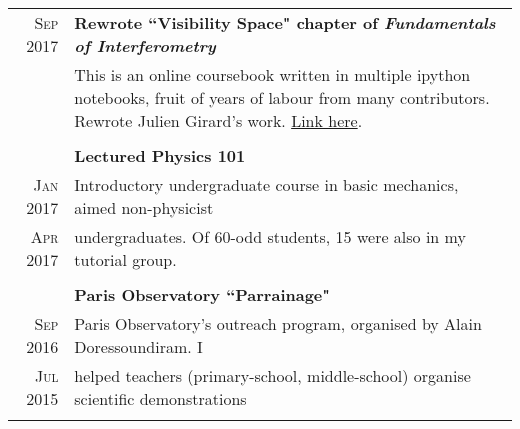 \documentclass[10pt]{article} %
\begin{document}
\begin{tabular}{r|p{12.5cm}}
	\textsc{Sep 2017} & \textbf{Rewrote ``Visibility Space" chapter of \emph{Fundamentals of Interferometry}}\\
	& This is an online coursebook written in multiple ipython notebooks, fruit of years of labour from many contributors. Rewrote Julien Girard's work. \hyperlink{https://github.com/ratt-ru/fundamentals_of_interferometry}{Link here}.\\                  
	\multicolumn{2}{c}{} \\

	& \textbf{Lectured Physics 101}\vspace{1mm}\\
	\textsc{Jan 2017} & Introductory undergraduate course in basic mechanics, aimed non-physicist\\
	\textsc{Apr 2017} & undergraduates. Of 60-odd students, 15 were also in my tutorial group.\\
	\multicolumn{2}{c}{} \\	

	
	& \textbf{Paris Observatory ``Parrainage"}\vspace{1mm}\\
	\textsc{Sep 2016} & Paris Observatory’s outreach program, organised by Alain Doressoundiram. I\\
	\textsc{Jul 2015} & helped teachers (primary-school, middle-school) organise scientific demonstrations\\
	\multicolumn{2}{c}{} \\	
	
\end{tabular}
\end{document}
